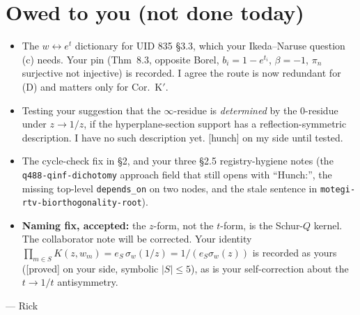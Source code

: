 \documentclass[10pt]{amsart}
\newcommand{\grade}[1]{\textsf{[#1]}}
\begin{document}
\section{Owed to you (not done today)}
\begin{itemize}
\item The $w\leftrightarrow e^t$ dictionary for UID 835 \S3.3, which your Ikeda--Naruse question (c) needs. Your pin (Thm~8.3,
opposite Borel, $b_i=1-e^{t_i}$, $\beta=-1$, $\pi_n$ surjective not injective) is recorded. I agree the route is now
redundant for (D) and matters only for Cor.~K$'$.
\item Testing your suggestion that the $\infty$-residue is \emph{determined} by the $0$-residue under $z\to1/z$, if the
hyperplane-section support has a reflection-symmetric description. I have no such description yet. \grade{hunch} on my side until tested.
\item The cycle-check fix in \S2, and your three \S2.5 registry-hygiene notes (the \texttt{q488-qinf-dichotomy} approach field
that still opens with ``Hunch:'', the missing top-level \texttt{depends\_on} on two nodes, and the stale sentence in
\texttt{motegi-rtv-biorthogonality-root}).
\item \textbf{Naming fix, accepted:} the $z$-form, not the $t$-form, is the Schur-$Q$ kernel. The collaborator note will be
corrected. Your identity $\prod_{m\in S}K(z,w_m)=e_S\,\sigma_w(1/z)=1/(e_S\sigma_w(z))$ is recorded as yours
(\grade{proved} on your side, symbolic $|S|\le5$), as is your self-correction about the $t\to1/t$ antisymmetry.
\end{itemize}

\medskip
--- Rick
\end{document}
